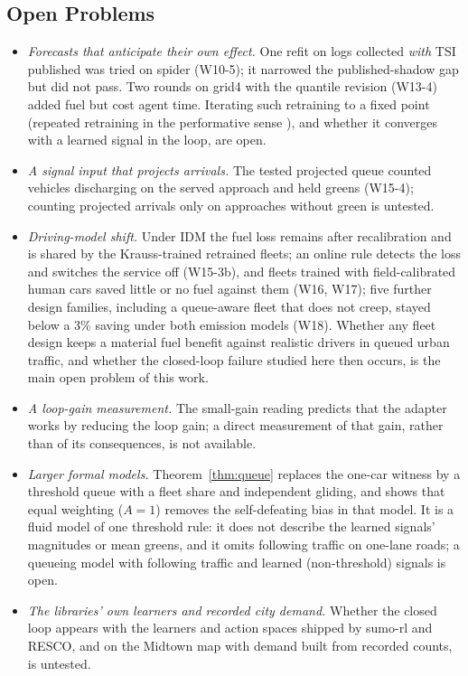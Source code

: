 \subsection{Open Problems}
\begin{itemize}\setlength\itemsep{1pt}
\item \emph{Forecasts that anticipate their own effect.} One refit on logs collected \emph{with} TSI published was tried on spider (W10-5); it
narrowed the published-shadow gap but did not pass. Two rounds on grid4 with the quantile revision (W13-4) added fuel but cost agent time. Iterating such retraining to a fixed point (repeated retraining in the performative
sense \cite{perdomo2020}), and whether it converges with a learned signal in the loop, are open.
\item \emph{A signal input that projects arrivals.} The tested projected queue counted vehicles discharging on the served approach and
held greens (W15-4); counting projected arrivals only on approaches without green is untested.
\item \emph{Driving-model shift.} Under IDM the fuel loss remains after recalibration and is shared by the Krauss-trained retrained fleets;
an online rule detects the loss and switches the service off (W15-3b), and fleets trained with field-calibrated human cars saved little or
no fuel against them (W16, W17); five further design families, including a queue-aware fleet that does not creep, stayed below a 3\%
saving under both emission models (W18). Whether any fleet design keeps a material fuel benefit against realistic drivers in queued urban
traffic, and whether the closed-loop failure studied here then occurs, is the main open problem of this work.
\item \emph{A loop-gain measurement.} The small-gain reading predicts that the adapter works by reducing the loop gain; a direct
measurement of that gain, rather than of its consequences, is not available.
\item \emph{Larger formal models.} Theorem~\ref{thm:queue} replaces the one-car witness by a threshold queue with a fleet share and
independent gliding, and shows that equal weighting ($A=1$) removes the self-defeating bias in that model. It is a fluid model of one threshold rule:
it does not describe the learned signals' magnitudes or mean greens, and it omits following traffic on one-lane roads; a queueing model
with following traffic and learned (non-threshold) signals is open.
\item \emph{The libraries' own learners and recorded city demand.} Whether the closed loop appears with the learners and action spaces
shipped by sumo-rl and RESCO, and on the Midtown map with demand built from recorded counts, is untested.
\end{itemize}

